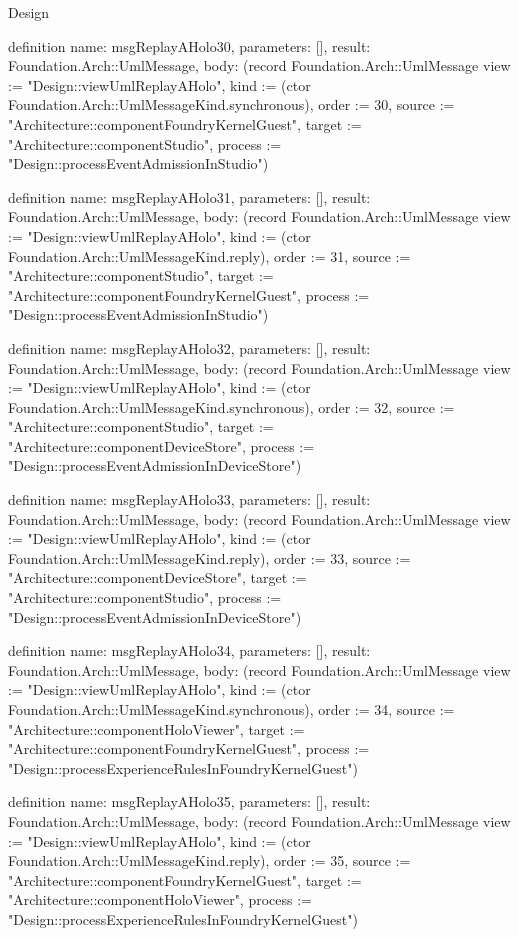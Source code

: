 \begin{lexlean}{Design}
\begin{semanticmodule}
definition{
  name: msgReplayAHolo30,
  parameters: [],
  result: Foundation.Arch::UmlMessage,
  body: (record Foundation.Arch::UmlMessage {view := "Design::viewUmlReplayAHolo", kind := (ctor Foundation.Arch::UmlMessageKind.synchronous), order := 30, source := "Architecture::componentFoundryKernelGuest", target := "Architecture::componentStudio", process := "Design::processEventAdmissionInStudio"})
}

definition{
  name: msgReplayAHolo31,
  parameters: [],
  result: Foundation.Arch::UmlMessage,
  body: (record Foundation.Arch::UmlMessage {view := "Design::viewUmlReplayAHolo", kind := (ctor Foundation.Arch::UmlMessageKind.reply), order := 31, source := "Architecture::componentStudio", target := "Architecture::componentFoundryKernelGuest", process := "Design::processEventAdmissionInStudio"})
}

definition{
  name: msgReplayAHolo32,
  parameters: [],
  result: Foundation.Arch::UmlMessage,
  body: (record Foundation.Arch::UmlMessage {view := "Design::viewUmlReplayAHolo", kind := (ctor Foundation.Arch::UmlMessageKind.synchronous), order := 32, source := "Architecture::componentStudio", target := "Architecture::componentDeviceStore", process := "Design::processEventAdmissionInDeviceStore"})
}

definition{
  name: msgReplayAHolo33,
  parameters: [],
  result: Foundation.Arch::UmlMessage,
  body: (record Foundation.Arch::UmlMessage {view := "Design::viewUmlReplayAHolo", kind := (ctor Foundation.Arch::UmlMessageKind.reply), order := 33, source := "Architecture::componentDeviceStore", target := "Architecture::componentStudio", process := "Design::processEventAdmissionInDeviceStore"})
}

definition{
  name: msgReplayAHolo34,
  parameters: [],
  result: Foundation.Arch::UmlMessage,
  body: (record Foundation.Arch::UmlMessage {view := "Design::viewUmlReplayAHolo", kind := (ctor Foundation.Arch::UmlMessageKind.synchronous), order := 34, source := "Architecture::componentHoloViewer", target := "Architecture::componentFoundryKernelGuest", process := "Design::processExperienceRulesInFoundryKernelGuest"})
}

definition{
  name: msgReplayAHolo35,
  parameters: [],
  result: Foundation.Arch::UmlMessage,
  body: (record Foundation.Arch::UmlMessage {view := "Design::viewUmlReplayAHolo", kind := (ctor Foundation.Arch::UmlMessageKind.reply), order := 35, source := "Architecture::componentFoundryKernelGuest", target := "Architecture::componentHoloViewer", process := "Design::processExperienceRulesInFoundryKernelGuest"})
}


\end{semanticmodule}
\end{lexlean}
